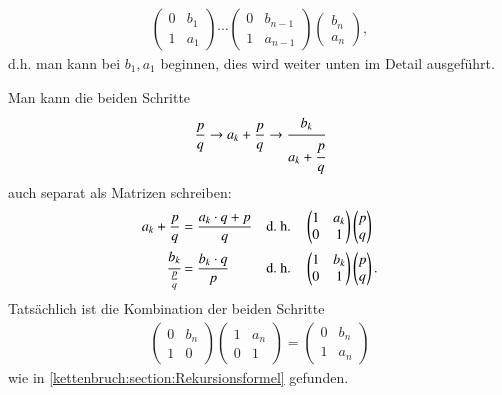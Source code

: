 \begin{align*}
		\begin{pmatrix}
			0& b_1\\
			1& a_1
		\end{pmatrix}
		\cdots
		\begin{pmatrix}
			0& b_{n-1}\\
			1& a_{n-1}
		\end{pmatrix}
		\begin{pmatrix}
			b_n\\
			a_n
		\end{pmatrix},
\end{align*}
d.h. man kann bei $b_1, a_1$ beginnen, dies wird weiter unten im Detail
ausgeführt.

Man kann die beiden Schritte
\begin{align*}
\frac{p}{q} \rightarrow a_k + \frac{p}{q} \rightarrow \cfrac{b_k}{a_k + \cfrac{p}{q}}
\end{align*}
auch separat als Matrizen schreiben:
\[
\begin{aligned}
a_k + \frac{p}{q} &= \frac{a_k \cdot q + p}{q} &&\text{d.~h.} &&
	\begin{pmatrix}
		1& a_k\\
		0& 1
	\end{pmatrix}
	\begin{pmatrix}
		p\\
		q
	\end{pmatrix}
\\
\cfrac{b_k}{\frac{p}{q}} &= \frac{b_k \cdot q}{p} &&\text{d.~h.} &&
	\begin{pmatrix}
		1& b_k\\
		0& 1
	\end{pmatrix}
	\begin{pmatrix}
		p\\
		q
	\end{pmatrix}.
\end{aligned}
\]
Tatsächlich ist die Kombination der beiden Schritte
\begin{align*}
		\begin{pmatrix}
			0& b_n\\
			1& 0
		\end{pmatrix}
		\begin{pmatrix}
			1& a_n\\
			0& 1
		\end{pmatrix}
	=	\begin{pmatrix}
			0& b_n\\
			1& a_n
		\end{pmatrix}
\end{align*}
wie in \eqref{kettenbruch:section:Rekursionsformel}  gefunden.
